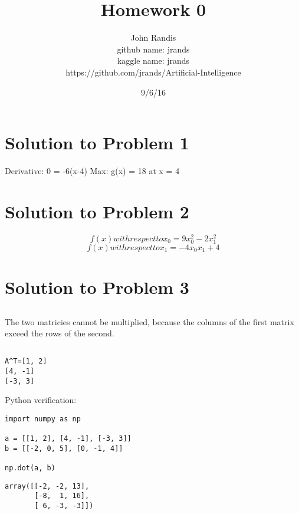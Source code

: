 \documentclass[a4paper]{article}
\title{Homework 0}
\date{9/6/16}
\author{John Randis \\ github name: jrands \\ kaggle name: jrands \\ https://github.com/jrands/Artificial-Intelligence}
\begin{document}
\lstset{language=Python}

\maketitle

\section{Solution to Problem 1}
Derivative: 0 = -6(x-4)
Max: g(x) = 18 at x = 4

\section{Solution to Problem 2}


\begin{equation}
  f(x) with respect to x_{0} = 9x_{0}^2 - 2x_{1}^2
\end{equation}
\begin{equation}
  f(x) with respect to x_{1} = -4x_{0}x_{1} + 4
\end{equation}

\section{Solution to Problem 3}
\subsection {}
The two matricies cannot be multiplied, because the columns of the first matrix exceed the rows of the second. 

\subsection {}
\begin{lstlisting}
A^T=[1, 2]
[4, -1]
[-3, 3]
\end{lstlisting}

Python verification: 

\begin{lstlisting}[frame=single]
import numpy as np

a = [[1, 2], [4, -1], [-3, 3]]
b = [[-2, 0, 5], [0, -1, 4]]

np.dot(a, b)

\end{lstlisting}

\begin{lstlisting}
array([[-2, -2, 13],
       [-8,  1, 16],
       [ 6, -3, -3]])
\end{lstlisting}
\end{document}
